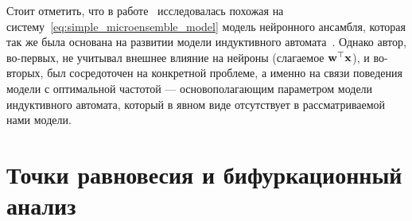
Стоит отметить, что в работе~\cite{Pchelkin2003} исследовалась похожая на систему~\eqref{eq:simple_microensemble_model} модель нейронного ансамбля, которая так же была основана на развитии модели индуктивного автомата~\cite{EmelyanovYaroslavsky1990}. Однако автор, во-первых, не учитывал внешнее влияние на нейроны (слагаемое $\mathrm{\mathbf{w}}^{\top} \mathrm{\mathbf{x}}$), и во-вторых, был сосредоточен на конкретной проблеме, а именно на связи поведения модели с \socalled оптимальной частотой --- основополагающим параметром модели индуктивного автомата, который в явном виде отсутствует в рассматриваемой нами модели.


\section{Точки равновесия и бифуркационный анализ} \label{section:neuron_equilibrium}

